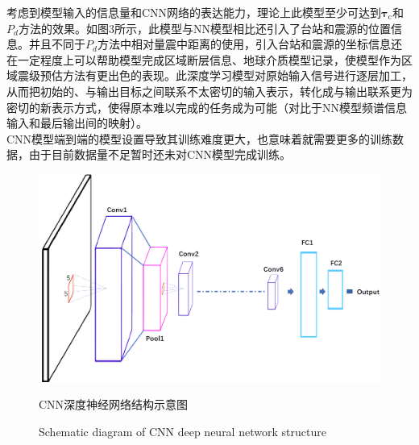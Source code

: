 \indent 考虑到模型输入的信息量和CNN网络的表达能力，理论上此模型至少可达到$\mathbf{\tau}_{\mathrm{c}}$和$P_{d}$方法的效果。如图3所示，此模型与NN模型相比还引入了台站和震源的位置信息。并且不同于$P_{d}$方法中相对量震中距离的使用，引入台站和震源的坐标信息还在一定程度上可以帮助模型完成区域断层信息、地球介质模型记录，使模型作为区域震级预估方法有更出色的表现。此深度学习模型对原始输入信号进行逐层加工，从而把初始的、与输出目标之间联系不太密切的输入表示，转化成与输出联系更为密切的新表示方式，使得原本难以完成的任务成为可能（对比于NN模型频谱信息输入和最后输出间的映射）。\\
\indent CNN模型端到端的模型设置导致其训练难度更大，也意味着就需要更多的训练数据，由于目前数据量不足暂时还未对CNN模型完成训练。\\
\begin{figure}[h] 
\centering 
 \includegraphics[width=0.99\linewidth]{img/CNN-paper.png} 
 \renewcommand{\figurename}{图} 
\caption{CNN深度神经网络结构示意图} 
\addtocounter{figure}{-1} \vspace{-5pt} 
\renewcommand{\figurename}{Fig} 
\caption{Schematic diagram of CNN deep neural network structure} 
\renewcommand{\figurename}{图} 
\label{fig:network-device-influence.png} 
\end{figure}
